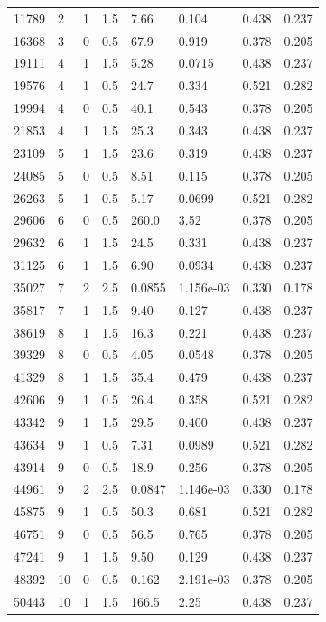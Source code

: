 \documentclass[preview]{standalone}
\begin{document}
{{\begin{tabular}{L{1.2cm}C{1.2cm} C{0.3cm}C{0.5cm} C{1.4cm}C{1.4cm} C{1.4cm}C{1.4cm}}
  11789  &     2  & 1     & 1.5 &  7.66  & 0.104  & 0.438 &  0.237   \\ 
  16368  &     3  & 0     & 0.5 &  67.9  & 0.919  & 0.378 &  0.205   \\ 
  19111  &     4  & 1     & 1.5 &  5.28  & 0.0715  & 0.438 &  0.237   \\ 
  19576  &     4  & 1     & 0.5 &  24.7  & 0.334  & 0.521 &  0.282   \\ 
  19994  &     4  & 0     & 0.5 &  40.1  & 0.543  & 0.378 &  0.205   \\ 
  21853  &     4  & 1     & 1.5 &  25.3  & 0.343  & 0.438 &  0.237   \\ 
  23109  &     5  & 1     & 1.5 &  23.6  & 0.319  & 0.438 &  0.237   \\ 
  24085  &     5  & 0     & 0.5 &  8.51  & 0.115  & 0.378 &  0.205   \\ 
  26263  &     5  & 1     & 0.5 &  5.17  & 0.0699  & 0.521 &  0.282   \\ 
  29606  &     6  & 0     & 0.5 &  260.0  & 3.52  & 0.378 &  0.205   \\ 
  29632  &     6  & 1     & 1.5 &  24.5  & 0.331  & 0.438 &  0.237   \\ 
  31125  &     6  & 1     & 1.5 &  6.90  & 0.0934  & 0.438 &  0.237   \\ 
  35027  &     7  & 2     & 2.5 &  0.0855  & 1.156e-03  & 0.330 &  0.178   \\ 
  35817  &     7  & 1     & 1.5 &  9.40  & 0.127  & 0.438 &  0.237   \\ 
  38619  &     8  & 1     & 1.5 &  16.3  & 0.221  & 0.438 &  0.237   \\ 
  39329  &     8  & 0     & 0.5 &  4.05  & 0.0548  & 0.378 &  0.205   \\ 
  41329  &     8  & 1     & 1.5 &  35.4  & 0.479  & 0.438 &  0.237   \\ 
  42606  &     9  & 1     & 0.5 &  26.4  & 0.358  & 0.521 &  0.282   \\ 
  43342  &     9  & 1     & 1.5 &  29.5  & 0.400  & 0.438 &  0.237   \\ 
  43634  &     9  & 1     & 0.5 &  7.31  & 0.0989  & 0.521 &  0.282   \\ 
  43914  &     9  & 0     & 0.5 &  18.9  & 0.256  & 0.378 &  0.205   \\ 
  44961  &     9  & 2     & 2.5 &  0.0847  & 1.146e-03  & 0.330 &  0.178   \\ 
  45875  &     9  & 1     & 0.5 &  50.3  & 0.681  & 0.521 &  0.282   \\ 
  46751  &     9  & 0     & 0.5 &  56.5  & 0.765  & 0.378 &  0.205   \\ 
  47241  &     9  & 1     & 1.5 &  9.50  & 0.129  & 0.438 &  0.237   \\ 
  48392  &    10  & 0     & 0.5 &  0.162  & 2.191e-03  & 0.378 &  0.205   \\ 
  50443  &    10  & 1     & 1.5 &  166.5  & 2.25  & 0.438 &  0.237   \\ 
\hline 
\end{tabular} 

}}
\end{document}
